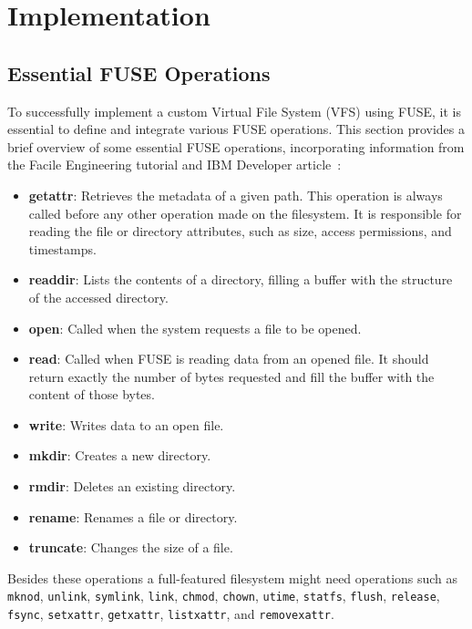 \chapter{Implementation}
\label{chap:implementation}

\section{Essential FUSE Operations}\label{sec:fuse-ops}

To successfully implement a custom Virtual File System (VFS) using FUSE, it is essential to define and integrate various FUSE operations.
This section provides a brief overview of some essential FUSE operations, incorporating information from the Facile Engineering tutorial and IBM Developer article~\cite{ibm_fuse, facile_fuse}:

\begin{itemize}
    \item \textbf{getattr}: Retrieves the metadata of a given path.
    This operation is always called before any other operation made on the filesystem.
    It is responsible for reading the file or directory attributes, such as size, access permissions, and timestamps.
    \item \textbf{readdir}: Lists the contents of a directory, filling a buffer with the structure of the accessed directory.
    \item \textbf{open}: Called when the system requests a file to be opened.
    \item \textbf{read}: Called when FUSE is reading data from an opened file.
    It should return exactly the number of bytes requested and fill the buffer with the content of those bytes.
    \item \textbf{write}: Writes data to an open file.
    \item \textbf{mkdir}: Creates a new directory.
    \item \textbf{rmdir}: Deletes an existing directory.
    \item \textbf{rename}: Renames a file or directory.
    \item \textbf{truncate}: Changes the size of a file.
\end{itemize}

Besides these operations a full-featured filesystem might need operations such as \texttt{mknod}, \texttt{unlink}, \texttt{symlink}, \texttt{link}, \texttt{chmod}, \texttt{chown}, \texttt{utime}, \texttt{statfs}, \texttt{flush}, \texttt{release}, \texttt{fsync}, \texttt{setxattr}, \texttt{getxattr}, \texttt{listxattr}, and \texttt{removexattr}.

